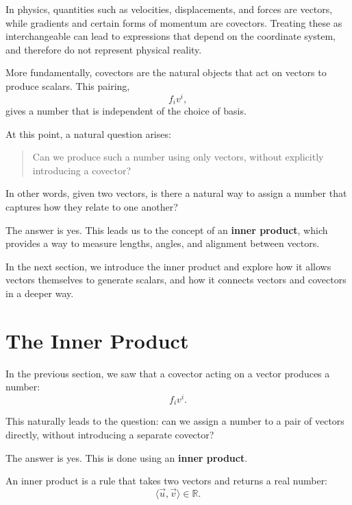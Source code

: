 \documentclass[11pt,openany]{book}
\theoremstyle{definition}
\begin{document}
\medskip

In physics, quantities such as velocities, displacements, and forces are vectors, 
while gradients and certain forms of momentum are covectors. Treating these as 
interchangeable can lead to expressions that depend on the coordinate system, and 
therefore do not represent physical reality.

\medskip

More fundamentally, covectors are the natural objects that act on vectors to 
produce scalars. This pairing,
\[
f_i v^i,
\]
gives a number that is independent of the choice of basis.

\medskip

At this point, a natural question arises:

\begin{quote}
Can we produce such a number using only vectors, without explicitly introducing a covector?
\end{quote}

\medskip

In other words, given two vectors, is there a natural way to assign a number that 
captures how they relate to one another?

\medskip

The answer is yes. This leads us to the concept of an \textbf{inner product}, which 
provides a way to measure lengths, angles, and alignment between vectors.

\medskip

In the next section, we introduce the inner product and explore how it allows 
vectors themselves to generate scalars, and how it connects vectors and covectors 
in a deeper way.

\chapter{The Inner Product}

In the previous section, we saw that a covector acting on a vector produces a number:
\[
f_i v^i.
\]

This naturally leads to the question: can we assign a number to a pair of vectors 
directly, without introducing a separate covector?

\medskip

The answer is yes. This is done using an \textbf{inner product}.

\medskip

An inner product is a rule that takes two vectors and returns a real number:
\[
\langle \vec{u}, \vec{v} \rangle \in \mathbb{R}.
\]
\end{document}
